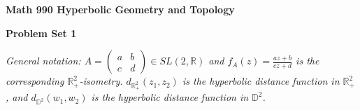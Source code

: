 \documentclass[12pt]{article}
\begin{document}
\def\ctln{\centerline}
\def\msk{\medskip}
\def\bsk{\bigskip}
\def\ssk{\smallskip}
\def\hsk{\hskip.3in}
\def\ra{\rightarrow}
\def\ubr{\underbar}

\def\mt{{\mathcal T}}
\def\mb{{\mathcal B}}
\def\ms{{\mathcal S}}
\def\mu{{\mathcal U}}
\def\mv{{\mathcal V}}

\def\bbc{{\mathbb C}}
\def\bbd{{\mathbb D}}
\def\bbr{{\mathbb R}}
\def\bbz{{\mathbb Z}}
\def\bbq{{\mathbb Q}}
\def\bbn{{\mathbb N}}
\def\spc{$~$\hskip.15in$~$}

\def\sset{\subseteq}
\def\del{\partial}
\def\lra{$\Leftrightarrow$}
\def\bra{$\Rightarrow$}
\def\dsp{\displaystyle}

\def\ddr{d_{\bbr^2_+}}
\def\ddd{d_{\bbd^2}}


\ctln{\bf Math 990 Hyperbolic Geometry and Topology}

\ctln{\bf Problem Set 1}

\msk

{\it General notation: $A=\begin{pmatrix} a & b \\ c & d \end{pmatrix}\in SL(2,\bbr)$ and
$\dsp f_A(z)=\frac{az+b}{cz+d}$ is the corresponding $\bbr^2_+$-isometry. 
$\ddr(z_1,z_2)$ is the hyperbolic distance function in $\bbr^2_+$, and 
$\ddd(w_1,w_2)$ is the hyperbolic distance function in $\bbd^2$.}
\end{document}
